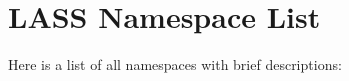 \section{LASS Namespace List}
Here is a list of all namespaces with brief descriptions:\begin{CompactList}
\item{}
\end{CompactList}
